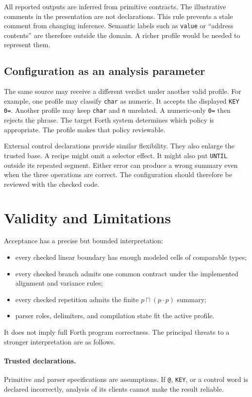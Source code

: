 \documentclass[11pt,a4paper]{article}
\newcommand{\meet}{\mathbin{\sqcap}}
\newcommand{\seq}{\mathbin{\cdot}}
\begin{document}
All reported outputs are inferred from primitive contracts.  The illustrative
comments in the presentation are not declarations.  This rule prevents a stale
comment from changing inference.  Semantic labels such as \texttt{value} or
``address contents'' are therefore outside the domain.  A richer profile would
be needed to represent them.

\subsection{Configuration as an analysis parameter}

The same source may receive a different verdict under another valid profile.
For example, one profile may classify \texttt{char} as numeric.  It accepts
the displayed \texttt{KEY 0=}.  Another profile may keep \texttt{char} and
\texttt{n} unrelated.  A numeric-only \texttt{0=} then rejects the phrase.
The target Forth system determines which policy is appropriate.  The profile
makes that policy reviewable.

External control declarations provide similar flexibility.  They also enlarge
the trusted base.  A recipe might omit a selector effect.  It might also put
\texttt{UNTIL} outside its repeated segment.  Either error can produce a wrong
summary even when the three operations are correct.  The configuration should
therefore be reviewed with the checked code.

\section{Validity and Limitations}
\label{sec:limits}

Acceptance has a precise but bounded interpretation:
\begin{itemize}
  \item every checked linear boundary has enough modeled cells of comparable
        types;
  \item every checked branch admits one common contract under the implemented
        alignment and variance rules;
  \item every checked repetition admits the finite $p\meet(p\seq p)$ summary;
  \item parser roles, delimiters, and compilation state fit the active profile.
\end{itemize}
It does not imply full Forth program correctness.  The principal threats to a
stronger interpretation are as follows.

\paragraph{Trusted declarations.}
Primitive and parser specifications are assumptions.  If \texttt{@},
\texttt{KEY}, or a control word is declared incorrectly, analysis of its
clients cannot make the result reliable.
\end{document}
